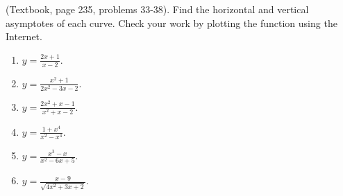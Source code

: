 (Textbook, page 235, problems 33-38).
Find the horizontal and vertical asymptotes of each curve. Check your work by plotting the function using the Internet.
\begin{multicols}{2}
\begin{enumerate}
\item $y=\frac{2x+1}{x-2}$.
\item $y=\frac{x^2+1}{2x^2-3x-2}$.
\item $y=\frac{2x^2+x-1}{x^2+x-2}$.
\item $y=\frac{1+x^4}{x^2-x^4}$.
\item $y=\frac{x^3-x}{x^2-6x+5}$.
\item $y=\frac{x-9}{\sqrt{4x^2+3x+2}}$.
\end{enumerate}
\end{multicols}